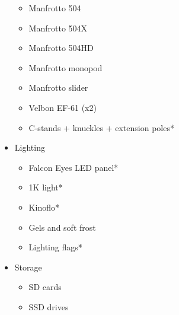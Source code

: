 \documentclass[]{article}
\begin{document}
\begin{itemize}
          \begin{itemize}
              \item Manfrotto 504
              \item Manfrotto 504X
              \item Manfrotto 504HD
              \item Manfrotto monopod
              \item Manfrotto slider
              \item Velbon EF-61 (x2)
              \item C-stands + knuckles + extension poles*
          \end{itemize}
    \item Lighting
          \begin{itemize}
              \item Falcon Eyes LED panel*
              \item 1K light*
              \item Kinoflo*
              \item Gels and soft frost
              \item Lighting flags*
          \end{itemize}
    \item Storage
          \begin{itemize}
              \item SD cards
              \item SSD drives
          \end{itemize}
\end{itemize}
\end{document}
